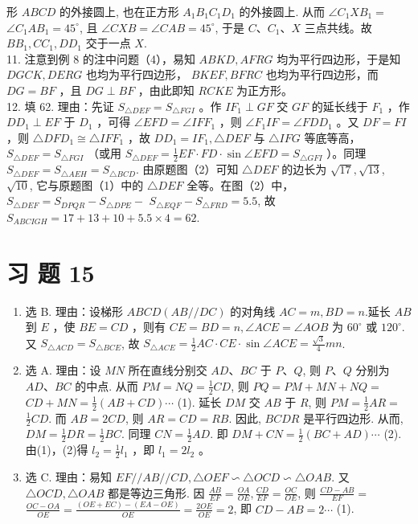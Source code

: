 \documentclass[10pt]{article}
\begin{document}
形 $A B C D$ 的外接圆上, 也在正方形 $A_{1} B_{1} C_{1} D_{1}$ 的外接圆上. 从而 $\angle C_{1} X B_{1}=$ $\angle C_{1} A B_{1}=45^{\circ}$, 且 $\angle C X B=\angle C A B=45^{\circ}$, 于是 $C 、 C_{1} 、 X$ 三点共线。故 $B B_{1}, C C_{1}, D D_{1}$ 交于一点 $X$.\\
11. 注意到例 8 的注中问题（4），易知 $A B K D, A F R G$ 均为平行四边形，于是知 $D G C K, D E R G$ 也均为平行四边形， $B K E F, B F R C$ 也均为平行四边形，而 $D G=B F$ ，且 $D G \perp B F$ ，由此即知 $R C K E$ 为正方形。\\
12. 填 62. 理由：先证 $S_{\triangle D E F}=S_{\triangle F G I}$ 。作 $I F_{1} \perp G F$ 交 $G F$ 的延长线于 $F_{1}$ ，作 $D D_{1} \perp E F$ 于 $D_{1}$ ，可得 $\angle E F D=\angle I F F_{1}$ ，则 $\angle F_{1} I F=\angle F D D_{1}$ 。又 $D F=F I$ ，则 $\triangle D F D_{1} \cong \triangle I F F_{1}$ ，故 $D D_{1}=I F_{1}, \triangle D E F$ 与 $\triangle I F G$ 等底等高， $S_{\triangle D E F}=S_{\triangle F G I}$ （或用 $S_{\triangle D E F}=\frac{1}{2} E F \cdot F D \cdot \sin \angle E F D=S_{\triangle G F I}$ ）。同理 $S_{\triangle D E F}=S_{\triangle A E H}=S_{\triangle B C D}$. 由原题图（2）可知 $\triangle D E F$ 的边长为 $\sqrt{17}, \sqrt{13}$, $\sqrt{10}$, 它与原题图（1）中的 $\triangle D E F$ 全等。在图（2）中， $S_{\triangle D E F}=S_{D P Q R}-S_{\triangle D P E}-$ $S_{\triangle E Q F}-S_{\triangle F R D}=5.5$, 故 $S_{A B C I G H}=17+13+10+5.5 \times 4=62$.

\section*{习 题 15}
\begin{enumerate}
  \item 选 B. 理由：设梯形 $A B C D(A B / / D C)$ 的对角线 $A C=m, B D=n$.延长 $A B$ 到 $E$ ，使 $B E=C D$ ，则有 $C E=B D=n, \angle A C E=\angle A O B$ 为 $60^{\circ}$ 或 $120^{\circ}$. 又 $S_{\triangle A C D}=S_{\triangle B C E}$, 故 $S_{\triangle A C E}=\frac{1}{2} A C \cdot C E \cdot \sin \angle A C E=\frac{\sqrt{3}}{4} m n$.
  \item 选 A. 理由：设 $M N$ 所在直线分别交 $A D 、 B C$ 于 $P 、 Q$, 则 $P 、 Q$ 分别为 $A D 、 B C$ 的中点. 从而 $P M=N Q=\frac{1}{2} C D$, 则 $P Q=P M+M N+N Q=$ $C D+M N=\frac{1}{2}(A B+C D) \cdots$ (1). 延长 $D M$ 交 $A B$ 于 $R$, 则 $P M=\frac{1}{2} A R=$ $\frac{1}{2} C D$. 而 $A B=2 C D$, 则 $A R=C D=R B$. 因此, $B C D R$ 是平行四边形. 从而, $D M=\frac{1}{2} D R=\frac{1}{2} B C$. 同理 $C N=\frac{1}{2} A D$. 即 $D M+C N=\frac{1}{2}(B C+A D) \cdots$ (2).由(1)，(2)得 $l_{2}=\frac{1}{2} l_{1}$ ，即 $l_{1}=2 l_{2}$ 。
  \item 选 C. 理由：易知 $E F / / A B / / C D, \triangle O E F \backsim \triangle O C D \backsim \triangle O A B$. 又 $\triangle O C D, \triangle O A B$ 都是等边三角形. 因 $\frac{A B}{E F}=\frac{O A}{O E}, \frac{C D}{E F}=\frac{O C}{O E}$, 则 $\frac{C D-A B}{E F}=$ $\frac{O C-O A}{O E}=\frac{(O E+E C)-(E A-O E)}{O E}=\frac{2 O E}{O E}=2$, 即 $C D-A B=2 \cdots$ (1).
\end{enumerate}
\end{document}

